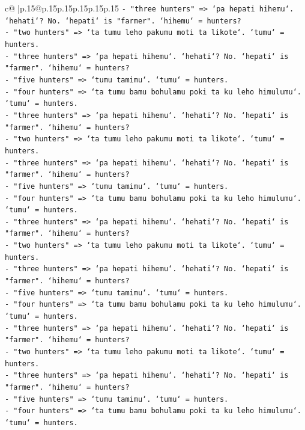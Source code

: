 \documentclass{article}
\begin{document}
{\begin{supertabular}{c@{$\;$}|p{.15\linewidth}@{}p{.15\linewidth}p{.15\linewidth}p{.15\linewidth}p{.15\linewidth}p{.15\linewidth}}
{{{\texttt{{-} "three hunters" => `pa hepati hihemu`. `hehati`? No. `hepati` is "farmer". `hihemu` = hunters?} \\
\texttt{{-} "two hunters" => `ta tumu leho pakumu moti ta likote`. `tumu` = hunters.} \\
\texttt{{-} "three hunters" => `pa hepati hihemu`. `hehati`? No. `hepati` is "farmer". `hihemu` = hunters?} \\
\texttt{{-} "five hunters" => `tumu tamimu`. `tumu` = hunters.} \\
\texttt{{-} "four hunters" => `ta tumu bamu bohulamu poki ta ku leho himulumu`. `tumu` = hunters.} \\
\texttt{{-} "three hunters" => `pa hepati hihemu`. `hehati`? No. `hepati` is "farmer". `hihemu` = hunters?} \\
\texttt{{-} "two hunters" => `ta tumu leho pakumu moti ta likote`. `tumu` = hunters.} \\
\texttt{{-} "three hunters" => `pa hepati hihemu`. `hehati`? No. `hepati` is "farmer". `hihemu` = hunters?} \\
\texttt{{-} "five hunters" => `tumu tamimu`. `tumu` = hunters.} \\
\texttt{{-} "four hunters" => `ta tumu bamu bohulamu poki ta ku leho himulumu`. `tumu` = hunters.} \\
\texttt{{-} "three hunters" => `pa hepati hihemu`. `hehati`? No. `hepati` is "farmer". `hihemu` = hunters?} \\
\texttt{{-} "two hunters" => `ta tumu leho pakumu moti ta likote`. `tumu` = hunters.} \\
\texttt{{-} "three hunters" => `pa hepati hihemu`. `hehati`? No. `hepati` is "farmer". `hihemu` = hunters?} \\
\texttt{{-} "five hunters" => `tumu tamimu`. `tumu` = hunters.} \\
\texttt{{-} "four hunters" => `ta tumu bamu bohulamu poki ta ku leho himulumu`. `tumu` = hunters.} \\
\texttt{{-} "three hunters" => `pa hepati hihemu`. `hehati`? No. `hepati` is "farmer". `hihemu` = hunters?} \\
\texttt{{-} "two hunters" => `ta tumu leho pakumu moti ta likote`. `tumu` = hunters.} \\
\texttt{{-} "three hunters" => `pa hepati hihemu`. `hehati`? No. `hepati` is "farmer". `hihemu` = hunters?} \\
\texttt{{-} "five hunters" => `tumu tamimu`. `tumu` = hunters.} \\
\texttt{{-} "four hunters" => `ta tumu bamu bohulamu poki ta ku leho himulumu`. `tumu` = hunters.} \\
}}}
\end{supertabular}}
\end{document}
